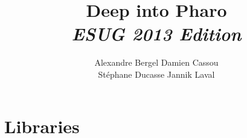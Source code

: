 \documentclass[a4paper,10pt,twoside]{book}
\begin{document}
\frontmatter
\setcounter{page}{1}
\pagestyle{headings}
\author{
	Alexandre Bergel\quad 
	Damien Cassou\quad \\
	St\'ephane Ducasse\quad 
	Jannik Laval
	}
\title{\Huge\bf Deep into Pharo\\
\small\emph{ESUG 2013 Edition}
}

\date{}
\maketitle




\tableofcontents
\sloppy %
\mainmatter






\part{Libraries}



 
\end{document}
